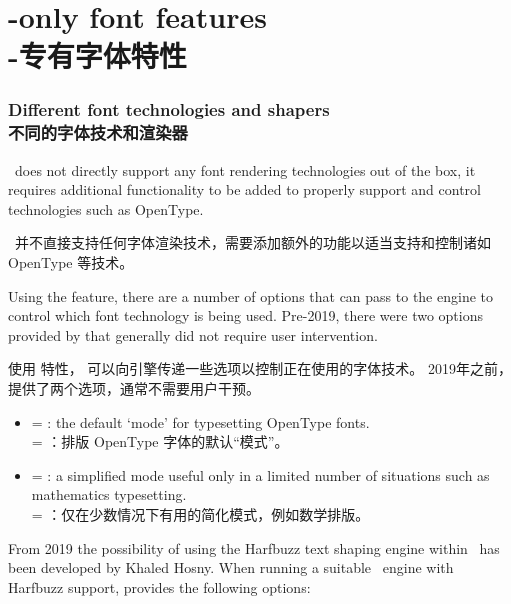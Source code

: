 \documentclass[a4paper]{l3doc}
\begin{document}
\part{\LuaTeX-only font features\\\LuaTeX-专有字体特性}
\label{sec:luatex-features}

\section{Different font technologies and shapers\\不同的字体技术和渲染器}
\label{sec:renderer-luatex}

\LuaTeX\ does not directly support any font rendering technologies out of the box, it
requires additional functionality to be added to properly support and control technologies such as OpenType.

\LuaTeX\ 并不直接支持任何字体渲染技术，需要添加额外的功能以适当支持和控制诸如 OpenType 等技术。

Using the  feature, there are a number of options that  can pass to the engine to control which font technology is being used.
Pre-2019, there were two options provided by  that generally did not require user intervention.

使用  特性， 可以向引擎传递一些选项以控制正在使用的字体技术。
2019年之前， 提供了两个选项，通常不需要用户干预。
\begin{itemize}
\item {} =  : the default `mode' for typesetting OpenType fonts.
\\ = ：排版 OpenType 字体的默认“模式”。
\item {} =  : a simplified mode useful only in a limited number of situations such as mathematics typesetting.
\\ = ：仅在少数情况下有用的简化模式，例如数学排版。
\end{itemize}


From 2019 the possibility of using the Harfbuzz text shaping engine within \LuaTeX\ has
been developed by Khaled Hosny. When running a suitable \LuaTeX\ engine with Harfbuzz support,  provides the following options:
\end{document}
